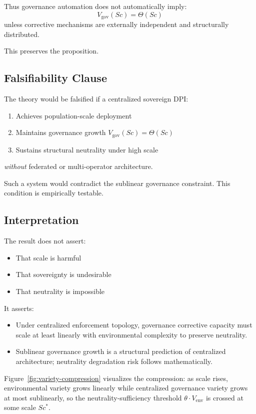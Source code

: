 \documentclass{article}
\begin{document}
Thus governance automation does not automatically imply:
\begin{equation}
V_{\text{gov}}(Sc) = \Theta(Sc)
\end{equation}
unless corrective mechanisms are externally independent and structurally distributed.

This preserves the proposition.

\subsection{Falsifiability Clause}

The theory would be falsified if a centralized sovereign DPI:
\begin{enumerate}[noitemsep]
    \item Achieves population-scale deployment
    \item Maintains governance growth $V_{\text{gov}}(Sc) = \Theta(Sc)$
    \item Sustains structural neutrality under high scale
\end{enumerate}
\textit{without} federated or multi-operator architecture.

Such a system would contradict the sublinear governance constraint. This condition is empirically testable.

\subsection{Interpretation}

The result does not assert:
\begin{itemize}[noitemsep]
    \item That scale is harmful
    \item That sovereignty is undesirable
    \item That neutrality is impossible
\end{itemize}

It asserts:
\begin{itemize}[noitemsep]
    \item Under centralized enforcement topology, governance corrective capacity must scale at least linearly with environmental complexity to preserve neutrality.
    \item Sublinear governance growth is a structural prediction of centralized architecture; neutrality degradation risk follows mathematically.
\end{itemize}

Figure~\ref{fig:variety-compression} visualizes the compression: as scale rises, environmental variety grows linearly while centralized governance variety grows at most sublinearly, so the neutrality-sufficiency threshold $\theta \cdot V_{\text{env}}$ is crossed at some scale $Sc^*$.
\end{document}
